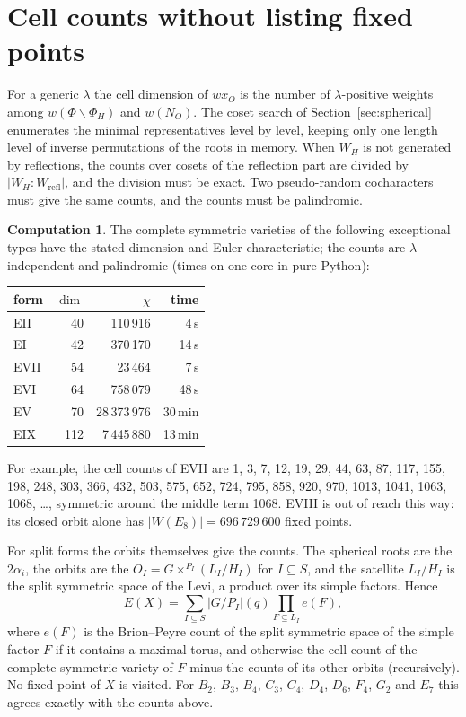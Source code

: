 \documentclass[11pt]{amsart}
\theoremstyle{definition}
\newtheorem{computation}[theorem]{Computation}
\theoremstyle{remark}
\begin{document}
\section{Cell counts without listing fixed points}\label{sec:large}

For a generic $\lambda$ the cell dimension of $w x_O$ is the number of
$\lambda$-positive weights among $w(\Phi\smallsetminus\Phi_H)$ and $w(N_O)$.
The coset search of Section~\ref{sec:spherical} enumerates the minimal
representatives level by level, keeping only one length level of inverse
permutations of the roots in memory. When $W_H$ is not generated by
reflections, the counts over cosets of the reflection part are divided by
$|W_H:W_{\mathrm{refl}}|$, and the division must be exact. Two
pseudo-random cocharacters must give the same counts, and the counts must
be palindromic.

\begin{computation}\label{comp:large}
The complete symmetric varieties of the following exceptional types have
the stated dimension and Euler characteristic; the counts are
$\lambda$-independent and palindromic (times on one core in pure Python):
\begin{center}
\begin{tabular}{lrrr}
\toprule
form & $\dim$ & $\chi$ & time\\
\midrule
EII & 40 & 110\,916 & 4\,s\\
EI & 42 & 370\,170 & 14\,s\\
EVII & 54 & 23\,464 & 7\,s\\
EVI & 64 & 758\,079 & 48\,s\\
EV & 70 & 28\,373\,976 & 30\,min\\
EIX & 112 & 7\,445\,880 & 13\,min\\
\bottomrule
\end{tabular}
\end{center}
For example, the cell counts of EVII are 1, 3, 7, 12, 19, 29, 44, 63, 87,
117, 155, 198, 248, 303, 366, 432, 503, 575, 652, 724, 795, 858, 920, 970,
1013, 1041, 1063, 1068, \dots, symmetric around the middle term 1068. EVIII is out of reach this way:
its closed orbit alone has $|W(E_8)| = 696\,729\,600$ fixed points.
\end{computation}

For split forms the orbits themselves give the counts. The spherical roots
are the $2\alpha_i$, the orbits are the $O_I=G\times^{P_I}(L_I/H_I)$ for
$I\subseteq S$, and the satellite $L_I/H_I$ is the split symmetric space of the
Levi, a product over its simple factors. Hence
\[
E(X)=\sum_{I\subseteq S}|G/P_I|(q)\prod_{F\subseteq L_I}e(F),
\]
where $e(F)$ is the Brion--Peyre count of the split symmetric space of the
simple factor $F$ if it contains a maximal torus, and otherwise the cell
count of the complete symmetric variety of $F$ minus the counts of its other
orbits (recursively). No fixed point of $X$ is visited. For $B_2$, $B_3$,
$B_4$, $C_3$, $C_4$, $D_4$, $D_6$, $F_4$, $G_2$ and $E_7$ this agrees exactly
with the counts above.
\end{document}
